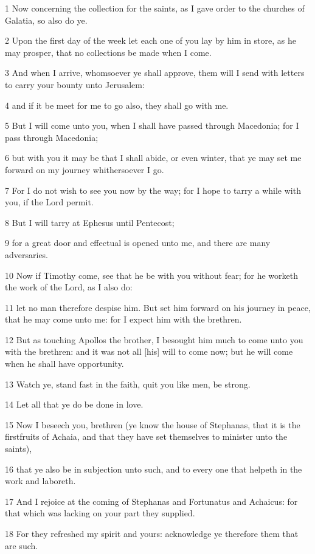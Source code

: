 \par 1 Now concerning the collection for the saints, as I gave order to the churches of Galatia, so also do ye.
\par 2 Upon the first day of the week let each one of you lay by him in store, as he may prosper, that no collections be made when I come.
\par 3 And when I arrive, whomsoever ye shall approve, them will I send with letters to carry your bounty unto Jerusalem:
\par 4 and if it be meet for me to go also, they shall go with me.
\par 5 But I will come unto you, when I shall have passed through Macedonia; for I pass through Macedonia;
\par 6 but with you it may be that I shall abide, or even winter, that ye may set me forward on my journey whithersoever I go.
\par 7 For I do not wish to see you now by the way; for I hope to tarry a while with you, if the Lord permit.
\par 8 But I will tarry at Ephesus until Pentecost;
\par 9 for a great door and effectual is opened unto me, and there are many adversaries.
\par 10 Now if Timothy come, see that he be with you without fear; for he worketh the work of the Lord, as I also do:
\par 11 let no man therefore despise him. But set him forward on his journey in peace, that he may come unto me: for I expect him with the brethren.
\par 12 But as touching Apollos the brother, I besought him much to come unto you with the brethren: and it was not all [his] will to come now; but he will come when he shall have opportunity.
\par 13 Watch ye, stand fast in the faith, quit you like men, be strong.
\par 14 Let all that ye do be done in love.
\par 15 Now I beseech you, brethren (ye know the house of Stephanas, that it is the firstfruits of Achaia, and that they have set themselves to minister unto the saints),
\par 16 that ye also be in subjection unto such, and to every one that helpeth in the work and laboreth.
\par 17 And I rejoice at the coming of Stephanas and Fortunatus and Achaicus: for that which was lacking on your part they supplied.
\par 18 For they refreshed my spirit and yours: acknowledge ye therefore them that are such.
